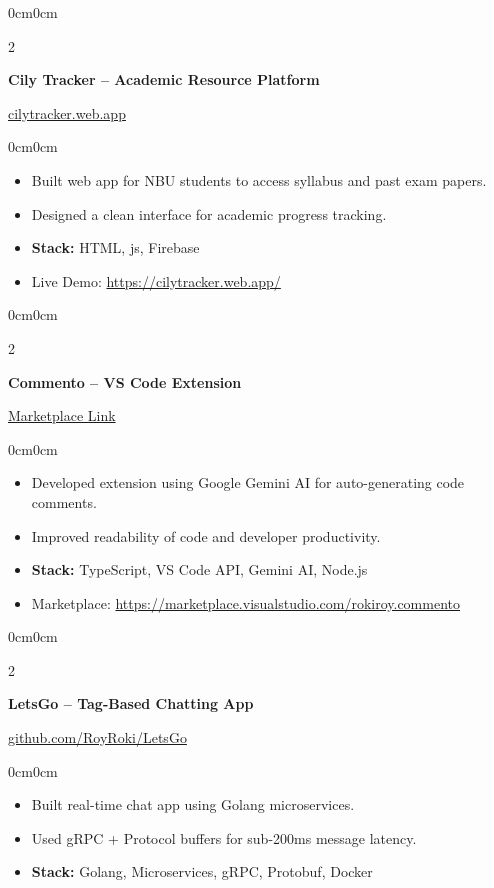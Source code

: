 \documentclass[10pt, letterpaper]{article}
\newenvironment{highlights}{
    \begin{itemize}[topsep=0.15cm, parsep=0.10cm, itemsep=0pt, leftmargin=10pt]
}{
    \end{itemize}
}
\newenvironment{onecolentry}{\begin{adjustwidth}{0cm}{0cm}}{\end{adjustwidth}}
\newenvironment{twocolentry}[2][]{
    \onecolentry
    \def\secondColumn{#2}
    \setcolumnwidth{\fill, 4.2cm}
    \begin{paracol}{2}
}{
    \switchcolumn \raggedleft \secondColumn
    \end{paracol}
    \endonecolentry
}
\begin{document}
\begin{twocolentry}{\href{https://cilytracker.web.app/}{cilytracker.web.app}}
    \textbf{Cily Tracker – Academic Resource Platform}
\end{twocolentry}
\begin{onecolentry}
    \begin{highlights}
        \item Built web app for NBU students to access syllabus and past exam papers.
        \item Designed a clean interface for academic progress tracking.
        \item \textbf{Stack:} HTML, js, Firebase
        \item Live Demo: \href{https://cilytracker.web.app/}{https://cilytracker.web.app/}
    \end{highlights}
\end{onecolentry}

\begin{twocolentry}{\href{https://marketplace.visualstudio.com/items?itemName=rokiroy.commento}{Marketplace Link}}
    \textbf{Commento – VS Code Extension}
\end{twocolentry}
\begin{onecolentry}
    \begin{highlights}
        \item Developed extension using Google Gemini AI for auto-generating code comments.
        \item Improved readability of code and developer productivity.
        \item \textbf{Stack:} TypeScript, VS Code API, Gemini AI, Node.js
        \item Marketplace: \href{https://marketplace.visualstudio.com/items?itemName=rokiroy.commento}{https://marketplace.visualstudio.com/rokiroy.commento}
    \end{highlights}
\end{onecolentry}

\begin{twocolentry}{\href{https://github.com/RoyRoki/LetsGo}{github.com/RoyRoki/LetsGo}}
    \textbf{LetsGo – Tag-Based Chatting App}
\end{twocolentry}
\begin{onecolentry}
    \begin{highlights}
        \item Built real-time chat app using Golang microservices.
        \item Used gRPC + Protocol buffers for sub-200ms message latency.
        \item \textbf{Stack:} Golang, Microservices, gRPC, Protobuf, Docker \end{highlights}
\end{onecolentry}
\end{document}
